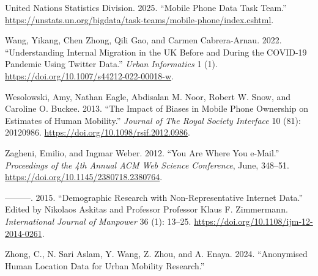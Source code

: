 \documentclass{article}
\newlength{\cslhangindent}
\newenvironment{CSLReferences}[2] %
 {\begin{list}{}{%
  \setlength{\itemindent}{0pt}
  \setlength{\leftmargin}{0pt}
  \setlength{\parsep}{0pt}
  \ifodd #1
   \setlength{\leftmargin}{\cslhangindent}
   \setlength{\itemindent}{-1\cslhangindent}
  \fi
  \setlength{\itemsep}{#2\baselineskip}}}
 {\end{list}}
\begin{document}
\begin{CSLReferences}{1}{0}
United Nations Statistics Division. 2025. {``Mobile Phone Data Task Team.''} \url{https://unstats.un.org/bigdata/task-teams/mobile-phone/index.cshtml}.

Wang, Yikang, Chen Zhong, Qili Gao, and Carmen Cabrera-Arnau. 2022. {``Understanding Internal Migration in the UK Before and During the COVID-19 Pandemic Using Twitter Data.''} \emph{Urban Informatics} 1 (1). \url{https://doi.org/10.1007/s44212-022-00018-w}.

Wesolowski, Amy, Nathan Eagle, Abdisalan M. Noor, Robert W. Snow, and Caroline O. Buckee. 2013. {``The Impact of Biases in Mobile Phone Ownership on Estimates of Human Mobility.''} \emph{Journal of The Royal Society Interface} 10 (81): 20120986. \url{https://doi.org/10.1098/rsif.2012.0986}.

Zagheni, Emilio, and Ingmar Weber. 2012. {``You Are Where You e-Mail.''} \emph{Proceedings of the 4th Annual ACM Web Science Conference}, June, 348--51. \url{https://doi.org/10.1145/2380718.2380764}.

---------. 2015. {``Demographic Research with Non-Representative Internet Data.''} Edited by Nikolaos Askitas and Professor Professor Klaus F. Zimmermann. \emph{International Journal of Manpower} 36 (1): 13--25. \url{https://doi.org/10.1108/ijm-12-2014-0261}.

Zhong, C., N. Sari Aslam, Y. Wang, Z. Zhou, and A. Enaya. 2024. {``Anonymised Human Location Data for Urban Mobility Research.''}

\end{CSLReferences}



\end{document}
